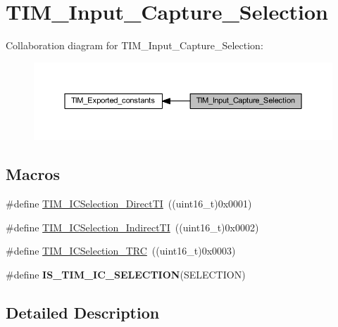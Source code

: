 \hypertarget{group___t_i_m___input___capture___selection}{}\section{T\+I\+M\+\_\+\+Input\+\_\+\+Capture\+\_\+\+Selection}
\label{group___t_i_m___input___capture___selection}
Collaboration diagram for T\+I\+M\+\_\+\+Input\+\_\+\+Capture\+\_\+\+Selection\+:\nopagebreak
\begin{figure}[H]
\begin{center}
\leavevmode
\includegraphics[width=350pt]{group___t_i_m___input___capture___selection}
\end{center}
\end{figure}
\subsection*{Macros}
\begin{DoxyCompactItemize}
\item 
\#define \hyperlink{group___t_i_m___input___capture___selection_ga3d38876044457b7faefe951d367ac8c3}{T\+I\+M\+\_\+\+I\+C\+Selection\+\_\+\+Direct\+TI}~((uint16\+\_\+t)0x0001)
\item 
\#define \hyperlink{group___t_i_m___input___capture___selection_ga2289b684133ac0b81ddfcd860d01b144}{T\+I\+M\+\_\+\+I\+C\+Selection\+\_\+\+Indirect\+TI}~((uint16\+\_\+t)0x0002)
\item 
\#define \hyperlink{group___t_i_m___input___capture___selection_ga2cd464e97ffd6ea3208ec65672f9a373}{T\+I\+M\+\_\+\+I\+C\+Selection\+\_\+\+T\+RC}~((uint16\+\_\+t)0x0003)
\item 
\#define {\bfseries I\+S\+\_\+\+T\+I\+M\+\_\+\+I\+C\+\_\+\+S\+E\+L\+E\+C\+T\+I\+ON}(S\+E\+L\+E\+C\+T\+I\+ON)
\end{DoxyCompactItemize}


\subsection{Detailed Description}


